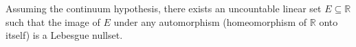 Assuming the continuum hypothesis, there exists an uncountable linear set $E \subseteq \mathbb{R}$ such that the image of $E$ under any automorphism (homeomorphism of $\mathbb{R}$ onto itself) is a Lebesgue nullset.
